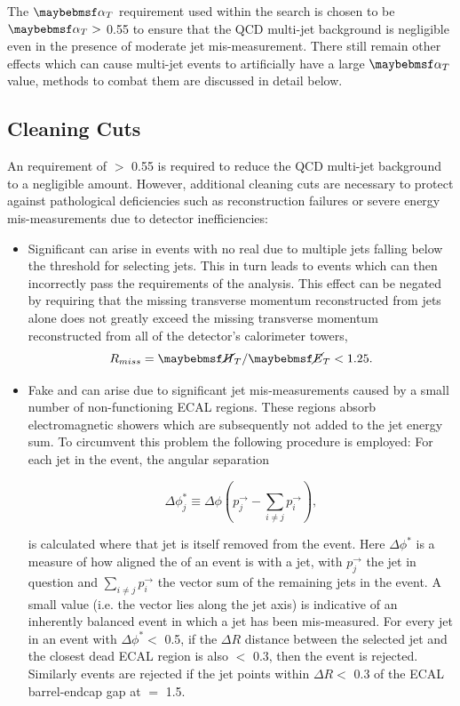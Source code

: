 The $\alphat$ requirement used within the search is chosen to be $\alphat >$ 0.55 to ensure that the QCD multi-jet background is negligible even in the presence of moderate jet mis-measurement. There still remain other effects which can cause multi-jet events to artificially have a large $\alphat$ value, methods to combat them are discussed in detail below.

\subsection{Cleaning Cuts}
\label{subsec:cleaningcuts}

An \alphat requirement of $>$ 0.55 is required to reduce the QCD multi-jet background to a negligible amount. However, additional cleaning cuts are necessary to protect against pathological deficiencies such as reconstruction failures or severe energy mis-measurements due to detector inefficiencies:

\begin{itemize}
\item Significant \mht can arise in events with no real \met due to multiple jets falling below the \pt threshold for selecting jets. This in turn leads to events which can then incorrectly pass the \alphat requirements of the analysis. This effect can be negated by requiring that the missing transverse momentum reconstructed from jets alone does not greatly exceed the missing transverse momentum reconstructed from all of the detector's calorimeter towers,
\begin{equation}
R_{miss} = \mht / \met < 1.25. \nonumber
\end{equation}  

\item Fake \met and \mht can arise due to significant jet mis-measurements caused by a small number of non-functioning \ac{ECAL} regions. These regions absorb electromagnetic showers which are subsequently not added to the jet energy sum. To circumvent this problem the following procedure is employed: For each jet in the event, the angular separation

\begin{equation}
\Delta\phi_{j}^{*}\equiv \Delta\phi(p^{\rightarrow}_{j}-\sum_{i\neq j}p^{\rightarrow}_{i}),
\end{equation}

is calculated where that jet is itself removed from the event. Here $\Delta\phi^{*}$ is a measure of how aligned the \mht of an event is with a jet, with $p^{\rightarrow}_{j}$ the jet in question and $\sum_{i\neq j}p^{\rightarrow}_{i}$ the vector sum of the remaining jets in the event. A small value (i.e. the \mht vector lies along the jet axis) is indicative of an inherently balanced event in which a jet has been mis-measured. For every jet in an event with $\Delta\phi^{*} <$ 0.5, if the $\Delta R$ distance between the selected jet and the closest dead \ac{ECAL} region is also $<$ 0.3, then the event is rejected. Similarly events are rejected if the jet points within $\Delta R <$ 0.3 of the \ac{ECAL} barrel-endcap gap at \abeta $=$ 1.5.

\end{itemize}


